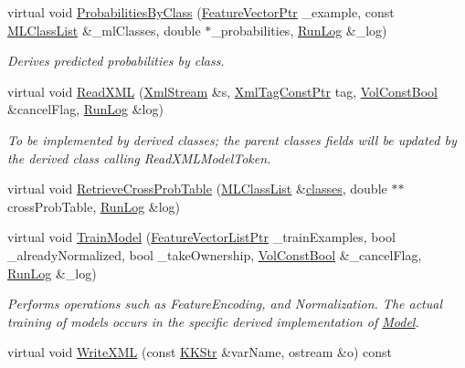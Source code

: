 \begin{DoxyCompactItemize}
\item 
virtual void \hyperlink{class_k_k_m_l_l_1_1_model_svm_base_a5e5b9d88b430b62c8f1a7d2b4db3991f}{Probabilities\+By\+Class} (\hyperlink{namespace_k_k_m_l_l_a0c5df3d48f45926fbc4fee04f5e3bc04}{Feature\+Vector\+Ptr} \+\_\+example, const \hyperlink{class_k_k_m_l_l_1_1_m_l_class_list}{M\+L\+Class\+List} \&\+\_\+ml\+Classes, double $\ast$\+\_\+probabilities, \hyperlink{class_k_k_b_1_1_run_log}{Run\+Log} \&\+\_\+log)
\begin{DoxyCompactList}\small\item\em Derives predicted probabilities by class. \end{DoxyCompactList}\item 
virtual void \hyperlink{class_k_k_m_l_l_1_1_model_svm_base_acbd2bc1b2c0208aecbf74514d38431a7}{Read\+X\+ML} (\hyperlink{class_k_k_b_1_1_xml_stream}{Xml\+Stream} \&s, \hyperlink{namespace_k_k_b_a5f1b0b1667d79fec26deeff10c43df23}{Xml\+Tag\+Const\+Ptr} tag, \hyperlink{namespace_k_k_b_a7d390f568e2831fb76b86b56c87bf92f}{Vol\+Const\+Bool} \&cancel\+Flag, \hyperlink{class_k_k_b_1_1_run_log}{Run\+Log} \&log)
\begin{DoxyCompactList}\small\item\em To be implemented by derived classes; the parent classes fields will be updated by the derived class calling Read\+X\+M\+L\+Model\+Token. \end{DoxyCompactList}\item 
virtual void \hyperlink{class_k_k_m_l_l_1_1_model_svm_base_a60b424c785d7d4af1c9664cbc5c3fa8b}{Retrieve\+Cross\+Prob\+Table} (\hyperlink{class_k_k_m_l_l_1_1_m_l_class_list}{M\+L\+Class\+List} \&\hyperlink{class_k_k_m_l_l_1_1_model_a764e7680f07814c3c5313dc4e4de60a1}{classes}, double $\ast$$\ast$cross\+Prob\+Table, \hyperlink{class_k_k_b_1_1_run_log}{Run\+Log} \&log)
\item 
virtual void \hyperlink{class_k_k_m_l_l_1_1_model_svm_base_a05f43d6e02a04d6a00079f7d85459eff}{Train\+Model} (\hyperlink{namespace_k_k_m_l_l_acf2ba92a3cf03e2b19674b24ff488ef6}{Feature\+Vector\+List\+Ptr} \+\_\+train\+Examples, bool \+\_\+already\+Normalized, bool \+\_\+take\+Ownership, \hyperlink{namespace_k_k_b_a7d390f568e2831fb76b86b56c87bf92f}{Vol\+Const\+Bool} \&\+\_\+cancel\+Flag, \hyperlink{class_k_k_b_1_1_run_log}{Run\+Log} \&\+\_\+log)
\begin{DoxyCompactList}\small\item\em Performs operations such as Feature\+Encoding, and Normalization. The actual training of models occurs in the specific derived implementation of \textquotesingle{}\hyperlink{class_k_k_m_l_l_1_1_model}{Model}\textquotesingle{}. \end{DoxyCompactList}\item 
virtual void \hyperlink{class_k_k_m_l_l_1_1_model_svm_base_aec3cf8dd16805af8483fbf7b836fcaf9}{Write\+X\+ML} (const \hyperlink{class_k_k_b_1_1_k_k_str}{K\+K\+Str} \&var\+Name, ostream \&o) const 
\end{DoxyCompactItemize}
